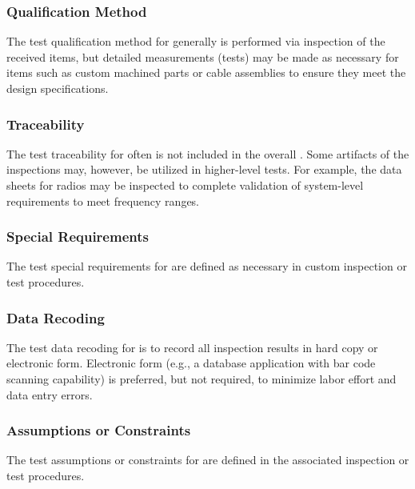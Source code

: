 \subsubsection{Qualification Method}
\label{loc:TestQualificationMethod\TestIdName}

The test qualification method for \TestIdNameX generally is performed via inspection of the received items, but detailed measurements (tests) may be made as necessary for items such as custom machined parts or cable assemblies to ensure they meet the design specifications.

\subsubsection{Traceability}
\label{loc:TestTraceability\TestIdName}

The test traceability for \TestIdNameX often is not included in the overall \RTVM.
Some artifacts of the \TestIdNameX inspections may, however, be utilized in higher-level tests.
For example, the data sheets for radios may be inspected to complete validation of system-level requirements to meet frequency ranges.

\subsubsection{Special Requirements}
\label{loc:TestSpecialRequirements\TestIdName}

The test special requirements for \TestIdNameX are defined as necessary in custom inspection or test procedures.

\subsubsection{Data Recoding}
\label{loc:TestDataRecoding\TestIdName}

The test data recoding for \TestIdNameX is to record all inspection results in hard copy or electronic form.
Electronic form (e.g., a database application with bar code scanning capability) is preferred, but not required, to minimize labor effort and data entry errors.

\subsubsection{Assumptions or Constraints}
\label{loc:TestAssumptionsOrConstraints\TestIdName}

The test assumptions or constraints for \TestIdNameX are defined in the associated inspection or test procedures.

